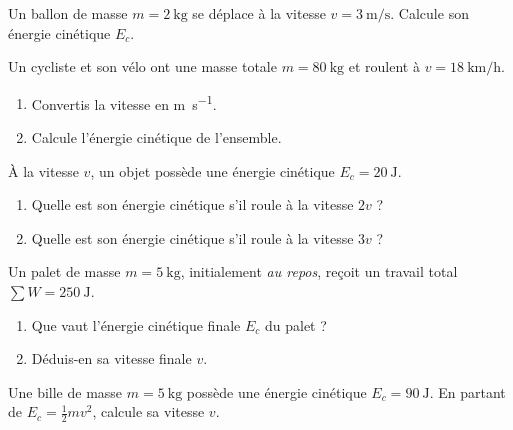 \documentclass[11pt,a4paper]{article}
\begin{document}

\begin{exo}
Un ballon de masse $m=\qty{2}{\kilogram}$ se déplace à la vitesse $v=\qty{3}{\metre\per\second}$.
Calcule son énergie cinétique $E_c$.
\end{exo}

\begin{exo}
Un cycliste et son vélo ont une masse totale $m=\qty{80}{\kilogram}$ et roulent à
$v=\qty{18}{\kilo\metre\per\hour}$.
\begin{enumerate}[label=\alph*)]
  \item Convertis la vitesse en \si{\metre\per\second}.
  \item Calcule l'énergie cinétique de l'ensemble.
\end{enumerate}
\end{exo}

\begin{exo}
À la vitesse $v$, un objet possède une énergie cinétique $E_c=\qty{20}{\joule}$.
\begin{enumerate}[label=\alph*)]
  \item Quelle est son énergie cinétique s'il roule à la vitesse $2v$ ?
  \item Quelle est son énergie cinétique s'il roule à la vitesse $3v$ ?
\end{enumerate}
\end{exo}

\begin{exo}
Un palet de masse $m=\qty{5}{\kilogram}$, initialement \emph{au repos}, reçoit un travail total
$\sum W=\qty{250}{\joule}$.
\begin{enumerate}[label=\alph*)]
  \item Que vaut l'énergie cinétique finale $E_c$ du palet ?
  \item Déduis-en sa vitesse finale $v$.
\end{enumerate}
\end{exo}

\begin{exo}
Une bille de masse $m=\qty{5}{\kilogram}$ possède une énergie cinétique $E_c=\qty{90}{\joule}$.
En partant de $E_c=\tfrac12 m v^2$, calcule sa vitesse $v$.
\end{exo}
\end{document}
